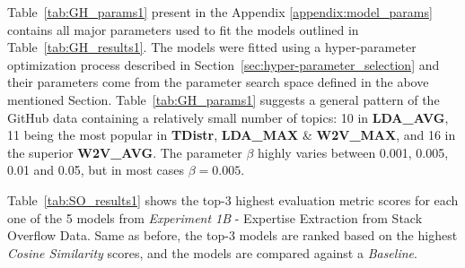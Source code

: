         Table~\ref{tab:GH_params1} present in the Appendix \ref{appendix:model_params} contains all major parameters used to fit the models outlined in Table~\ref{tab:GH_results1}. The models were fitted using a hyper-parameter optimization process described in Section~\ref{sec:hyper-parameter_selection} and their parameters come from the parameter search space defined in the above mentioned Section. Table~\ref{tab:GH_params1} suggests a general pattern of the GitHub data containing a relatively small number of topics: 10 in \textbf{LDA\_AVG}, 11 being the most popular in \textbf{TDistr}, \textbf{LDA\_MAX} \& \textbf{W2V\_MAX}, and 16 in the superior \textbf{W2V\_AVG}. The parameter $\beta$ highly varies between 0.001, 0.005, 0.01 and 0.05, but in most cases $\beta=0.005$.
        
        Table~\ref{tab:SO_results1} shows the top-$3$ highest evaluation metric scores for each one of the 5 models from \emph{Experiment 1B} - Expertise Extraction from Stack Overflow Data. Same as before, the top-$3$ models are ranked based on the highest \emph{Cosine Similarity} scores, and the models are compared against a \emph{Baseline}.
        
